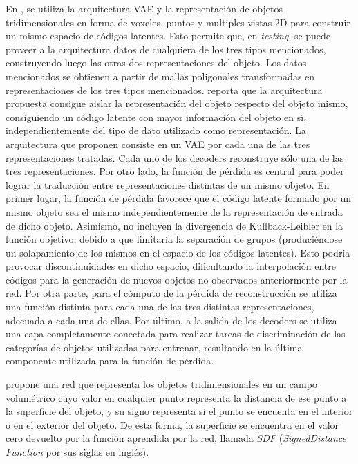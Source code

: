 \documentclass[12pt, spanish]{article}
\begin{document}
En \cite{Muralikrishnan2019}, se utiliza la arquitectura VAE y la
representación de objetos tridimensionales en forma de voxeles,
puntos y multiples vistas 2D para construir un mismo espacio de códigos
latentes. Esto permite que, en \textit{testing}, se puede proveer a la
arquitectura datos de cualquiera de los tres tipos mencionados,
construyendo luego las otras dos representaciones del objeto. Los datos
mencionados se obtienen a partir de mallas poligonales transformadas en
representaciones de los tres tipos mencionados.
\cite{Muralikrishnan2019} reporta que la arquitectura propuesta consigue
aislar la representación del objeto respecto del objeto mismo, consiguiendo
un código latente con mayor información del objeto en sí, independientemente
del tipo de dato utilizado como representación.
La arquitectura que proponen consiste en un VAE por cada una de las tres
representaciones tratadas. Cada uno de los decoders reconstruye sólo una
de las tres representaciones.
Por otro lado, la función de pérdida es central para poder lograr la
traducción entre representaciones distintas de un mismo objeto. En primer
lugar, la función de pérdida favorece que el código latente formado por un
mismo objeto sea el mismo independientemente de la representación de entrada
de dicho objeto. Asimismo, no incluyen la divergencia de Kullback-Leibler
en la función objetivo, debido a que limitaría la separación de grupos
(produciéndose un solapamiento de los mismos en el espacio de los códigos
latentes). Esto podría provocar discontinuidades en dicho espacio,
dificultando la interpolación entre códigos para la generación de nuevos
objetos no observados anteriormente por la red. Por otra parte, para el
cómputo de la pérdida de reconstrucción se utiliza una función distinta
para cada una de las tres distintas representaciones, adecuada a cada una
de ellas. Por último, a la salida de los decoders se utiliza una capa
completamente conectada para realizar tareas de discriminación de las
categorías de objetos utilizadas para entrenar, resultando en la última
componente utilizada para la función de pérdida.

\cite{Park2019} propone una red que representa los objetos tridimensionales
en un campo volumétrico cuyo valor en cualquier punto representa la 
distancia de ese punto a la superficie del objeto, y su signo representa si
el punto se encuenta en el interior o en el exterior del objeto. De esta
forma, la superficie se encuentra en el valor cero devuelto por la función
aprendida por la red, llamada \textit{SDF} (\textit{SignedDistance
Function} por sus siglas en inglés).
\end{document}
